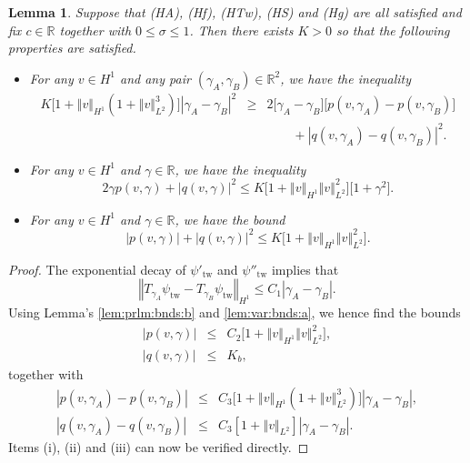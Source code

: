 \documentclass[10pt]{articleHJ}
\newcommand{\Real}{\mathbb{R}}							%
\newcommand{\abs}[1]{\left\vert#1\right\vert}			%
\newcommand{\norm}[1]{\left\Vert#1\right\Vert}		%
\newtheorem{lem}[thm]{Lemma}
\numberwithin{equation}{section}
\begin{document}
\begin{lem}
\label{lem:var:conds:thm:rock:prevot}
Suppose that (HA), (Hf), (HTw), (HS)
and (Hg) are all satisfied and fix
$c \in \Real$ together with
$0 \le \sigma \le 1$.
Then there exists $K > 0$ so that
the following properties are satisfied.
\begin{itemize}
\item[(i)]{
For any $v \in H^1$
and any pair $(\gamma_A, \gamma_B) \in \Real^2$,
we have the inequality
\begin{equation}
\begin{array}{lcl}
K \big[ 1 +  \norm{v}_{H^1}(1 +  \norm{v}^3_{L^2} ) \big]
     \abs{ \gamma_A - \gamma_B }^2
& \ge &
 2 \big[ \gamma_A - \gamma_B \big] \big[ p( v, \gamma_A) - p(v, \gamma_B) \big]
\\[0.2cm]
& & \qquad
   + \abs{q(v,  \gamma_A) - q(v, \gamma_B) }^2 .
\end{array}
\end{equation}
}
\item[(ii)]{
For any $v \in H^1$ and $\gamma \in \Real$,
we have the inequality
\begin{equation}
 2  \gamma p(v,\gamma)
   + \abs{q(v, \gamma)}^2
   \le K \big[ 1  + \norm{v}_{H^1} \norm{v}^2_{L^2} \big]
   \big[ 1 + \gamma^2 \big] .
\end{equation}
}
\item[(iii)]{
For any $v \in H^1$ and $\gamma \in \Real$,
we have the bound
\begin{equation}
  \abs{p(v,\gamma)} + \abs{q(v , \gamma)}^2
  \le K \big[ 1  + \norm{v}_{H^1} \norm{v}^2_{L^2} \big] .
\end{equation}
}
\end{itemize}
\end{lem}
\begin{proof}
The exponential decay of $\psi'_{\mathrm{tw}}$ and $\psi''_{\mathrm{tw}}$ implies that
\begin{equation}
\label{eq:var:diff:psi:tw}
\norm{T_{\gamma_A} \psi_{\mathrm{tw}} - T_{\gamma_B} \psi_{\mathrm{tw}} }_{H^1}
\le C_1 \abs{\gamma_A - \gamma_B}.
\end{equation}
Using
Lemma's \ref{lem:prlm:bnds:b} and \ref{lem:var:bnds:a},
we hence find the bounds
\begin{equation}
\begin{array}{lcl}
\abs{p(v, \gamma)}
& \le &
C_2 \big[ 1 +  \norm{v}_{H^1} \norm{v}^2_{L^2} \big] ,
\\[0.2cm]
\abs{q(v, \gamma)}
& \le & K_b,
\end{array}
\end{equation}
together with
\begin{equation}
\begin{array}{lcl}
\abs{p(v, \gamma_A) - p(v , \gamma_B)}
& \le &
C_3 \big[ 1  + \norm{v}_{H^1}(1 +  \norm{v}^3_{L^2} ) \big]
\abs{ \gamma_A - \gamma_B } ,
\\[0.2cm]
\abs{ q(v, \gamma_A) - q(v, \gamma_B) }
& \le & C_3 [1 + \norm{v}_{L^2}] \abs{\gamma_A - \gamma_B } .
\end{array}
\end{equation}
Items (i), (ii) and (iii) can now be verified directly.
\end{proof}
\end{document}
